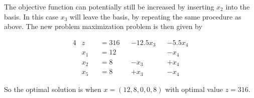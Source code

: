 The objective function can potentially still be increased by inserting $x_2$ into the basis. In this case $x_3$ will leave the basis, by repeating the same procedure as above. The new problem maximization problem is then given by

\begin{alignat*}{4}
&z     &&=  316  && - 12.5 x_3 &&   -5.5x_4    \\
&x_1   &&= 12    &&            &&     -x_4       \\
&x_2   &&= 8     &&       -x_3 &&     +x_4       \\
&x_5   &&= 8    &&        +x_3 &&     -x_4
\end{alignat*}

So the optimal solution is when $x=(12,8,0,0,8)$ with optimal value $z=316$.
